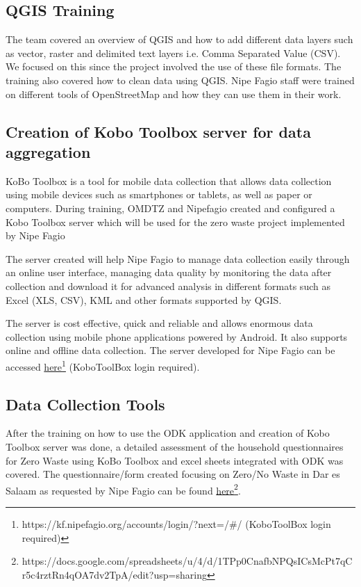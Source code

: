 \documentclass[a4paper,12pt,twoside]{article}
\begin{document}
\subsection{QGIS Training}

    The team covered an overview of QGIS and how to add different data layers such as vector, raster and delimited text layers i.e. Comma Separated Value (CSV). We focused on this since the project involved the use of these file formats. The training also covered how to clean data using QGIS. Nipe Fagio staff were trained on different tools of OpenStreetMap and how they can use them in their work.

\subsection{Creation of Kobo Toolbox  server for data aggregation}

    KoBo Toolbox is a tool for mobile data collection that allows data collection using mobile devices such as smartphones or tablets, as well as paper or computers. During training, OMDTZ and Nipefagio created and configured a Kobo Toolbox server which will be used for the zero waste project implemented  by Nipe Fagio
    
    The server created will help Nipe Fagio to manage data collection easily through an online user interface, managing data quality by monitoring the data after collection and download it for advanced analysis in different formats such as Excel (XLS, CSV), KML and other formats supported by QGIS.
    
    The server is cost effective, quick and reliable and allows enormous data collection using mobile phone applications powered by Android. It also supports online and offline data collection. The server developed for Nipe Fagio can be accessed \href{https://kf.nipefagio.org/accounts/login/?next=/#/}{here}\footnote{https://kf.nipefagio.org/accounts/login/?next=/#/ (KoboToolBox login required)} (KoboToolBox login required). 
	
\subsection{Data Collection Tools}

    After the training on how to use the ODK application and creation of Kobo Toolbox server was done, a detailed assessment of the household questionnaires for Zero Waste using KoBo Toolbox and excel sheets integrated with ODK was covered. The questionnaire/form created focusing on Zero/No Waste in Dar es Salaam as requested by Nipe Fagio can be found \href{https://docs.google.com/spreadsheets/u/4/d/1TPp0CnafbNPQsICsMcPt7qCr5c4rztRn4qOA7dv2TpA/edit?usp=sharing}{here}\footnote{https://docs.google.com/spreadsheets/u/4/d/1TPp0CnafbNPQsICsMcPt7qCr5c4rztRn4qOA7dv2TpA/edit?usp=sharing}. 
    
\end{document}
